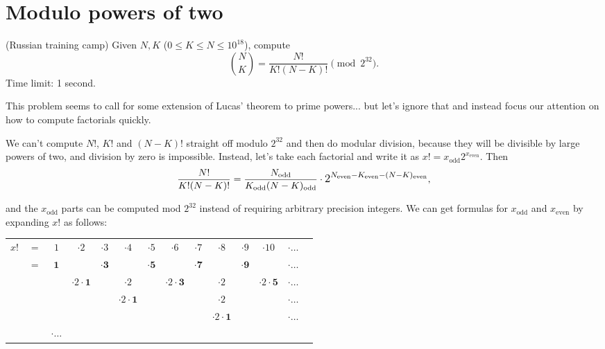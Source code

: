 \section{Modulo powers of two}
\begin{framed}
\noindent
(Russian training camp) Given $N, K$ ($0 \le K \le N \le 10^{18}$), compute
\[
\binom N K = \frac{N!}{K!(N-K)!} \pmod {2^{32}}.
\]
Time limit: 1 second.
\end{framed}
This problem seems to call for some extension of Lucas' theorem to prime powers... but let's ignore that and instead focus our attention on how to compute factorials quickly.

\newcommand{\odd}[1]{#1_\text{odd}}
\newcommand{\even}[1]{#1_\text{even}}
\newcommand{\dig}[1]{\cdot 2 \cdot \mathbf{#1}}

We can't compute $N!$, $K!$ and $(N-K)!$ straight off modulo $2^{32}$ and then do modular division, because they will be divisible by large powers of two, and division by zero is impossible.
Instead, let's take each factorial and write it as $x! = \odd{x}2^{\even{x}}$. Then
\[
\frac{N!}{K!(N-K)!} =
\frac{\odd N}{\odd K \odd{(N-K)}} \cdot \mathlarger{2^{\even N - \even K - \even{(N-K)}}},
\]

and the $\odd x$ parts can be computed mod $2^{32}$ instead of requiring arbitrary precision integers.
We can get formulas for $\odd x$ and $\even x$ by expanding $x!$ as follows:

\medskip

\noindent
\begin{tabular}{cccccccccccccc}
$x!$ & $=$ & $1$         & $\cdot 2$ & $\cdot 3$         & $\cdot 4$ & $\cdot 5$         & $\cdot 6$ & $\cdot 7$         & $\cdot 8$ & $\cdot 9$         & $\cdot 10$ & $\cdot \ldots$ \\
     & $=$ & $\mathbf 1$ &           & $\cdot \mathbf 3$ &           & $\cdot \mathbf 5$ &           & $\cdot \mathbf 7$ &           & $\cdot \mathbf 9$ &            & $\cdot \ldots$ \\
     &     &             & $\dig{1}$ &                   & $\cdot 2$ &                   & $\dig 3$  &                   & $\cdot 2$ &                   & $\dig 5$   & $\cdot \ldots$ \\
     &     &             &           &                   & $\dig 1$  &                   &           &                   & $\cdot 2$ &                   &            & $\cdot \ldots$ \\
     &     &             &           &                   &           &                   &           &                   & $\dig 1$  &                   &            & $\cdot \ldots$ \\
     &     & $\cdot \ldots$ &
\end{tabular}

